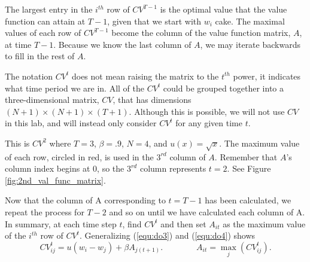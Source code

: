 The largest entry in the $i^{th}$ row of $CV^{T-1}$ is the optimal value that the value function can attain at $T-1$, given that we start with $w_i$ cake.
The maximal values of each row of $CV^{T-1}$ become the column of the value function matrix, $A$, at time $T-1$.
Because we know the last column of $A$, we may iterate backwards to fill in the rest of $A$.

\begin{warn}
The notation $CV^t$ does not mean raising the matrix to the $t^{th}$ power, it indicates what time period we are in.
All of the $CV^t$ could be grouped together into a three-dimensional matrix, $CV$, that has dimensions $(N+1) \times (N+1) \times (T+1)$.
Although this is possible, we will not use $CV$ in this lab, and will instead only consider $CV^t$ for any given time $t$.
\end{warn}

\begin{center}
\end{center}

This is $CV^{2}$ where $T=3$, $\beta = .9$, $N=4$, and $u(x) = \sqrt{x}$.
The maximum value of each row, circled in red, is used in the $3^{rd}$ column of $A$.
Remember that $A$'s column index begins at $0$, so the $3^{rd}$ column represents $t=2$.
See Figure \ref{fig:2nd_val_func_matrix}.


Now that the column of A corresponding to $t = T-1$ has been calculated, we repeat the process for $T-2$ and so on until we have calculated each column of A.
In summary, at each time step $t$, find $CV^t$ and then set $A_{it}$ as the maximum value of the $i^{th}$ row of $CV^t$.
Generalizing (\ref{equ:do3}) and (\ref{equ:do4}) shows
\begin{equation}\label{equ:do5}
CV^{t}_{ij} = u(w_i - w_j) + \beta A_{j(t+1)}.
\qquad \qquad
A_{it} = \max_{j} \left(CV_{ij}^t \right).
\end{equation}

